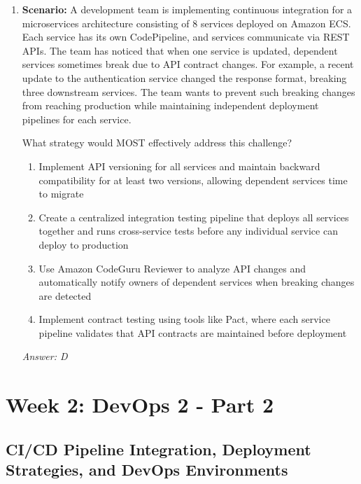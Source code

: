 \documentclass[12pt,a4paper]{article}
\begin{document}
\begin{enumerate}[label=\textbf{Q\arabic*.}]
\textit{Answer: B}

\item \textbf{Scenario:} A development team is implementing continuous integration for a microservices architecture consisting of 8 services deployed on Amazon ECS. Each service has its own CodePipeline, and services communicate via REST APIs. The team has noticed that when one service is updated, dependent services sometimes break due to API contract changes. For example, a recent update to the authentication service changed the response format, breaking three downstream services. The team wants to prevent such breaking changes from reaching production while maintaining independent deployment pipelines for each service.

What strategy would MOST effectively address this challenge?

\begin{enumerate}[label=\Alph*.]
    \item Implement API versioning for all services and maintain backward compatibility for at least two versions, allowing dependent services time to migrate
    \item Create a centralized integration testing pipeline that deploys all services together and runs cross-service tests before any individual service can deploy to production
    \item Use Amazon CodeGuru Reviewer to analyze API changes and automatically notify owners of dependent services when breaking changes are detected
    \item Implement contract testing using tools like Pact, where each service pipeline validates that API contracts are maintained before deployment
\end{enumerate}

\textit{Answer: D}

\end{enumerate}

\newpage
\section{Week 2: DevOps 2 - Part 2}
\subsection{CI/CD Pipeline Integration, Deployment Strategies, and DevOps Environments}
\end{document}
